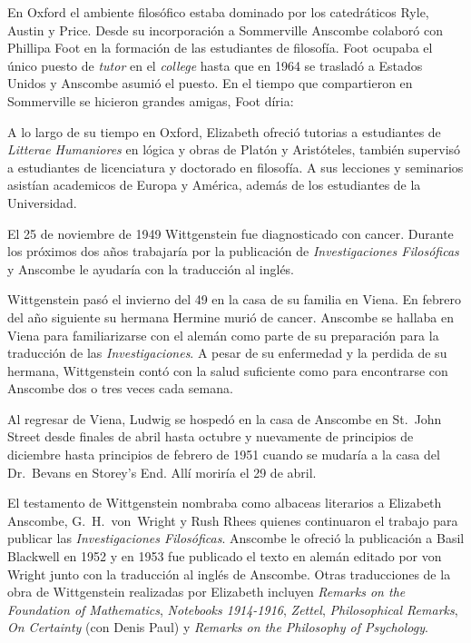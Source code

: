 En Oxford el ambiente filosófico estaba dominado por los catedráticos Ryle, Austin y Price. Desde su incorporación a Sommerville Anscombe colaboró con Phillipa Foot en la formación de las estudiantes de filosofía. Foot ocupaba el único puesto de \emph{tutor} en el \emph{college} hasta que en 1964 se trasladó a Estados Unidos y Anscombe asumió el puesto. En el tiempo que compartieron en Sommerville se hicieron grandes amigas, Foot díria: 

A lo largo de su tiempo en Oxford, Elizabeth ofreció tutorias a estudiantes de \emph{Litterae Humaniores} en lógica y obras de Platón y Aristóteles, también supervisó a estudiantes de licenciatura y doctorado en filosofía. A sus lecciones y seminarios asistían academicos de Europa y América, además de los estudiantes de la Universidad.\autocite[Cf.~][32]{teichman2002fellows}

El 25 de noviembre de 1949 Wittgenstein fue diagnosticado con cancer\autocite[cf.~][loc 11034]{monk}. Durante los próximos dos años trabajaría por la publicación de \emph{Investigaciones Filosóficas} y Anscombe le ayudaría con la traducción al inglés.

Wittgenstein pasó el invierno del 49 en la casa de su familia en Viena. En febrero del año siguiente su hermana Hermine murió de cancer. Anscombe se hallaba en Viena para familiarizarse con el alemán como parte de su preparación para la traducción de las \emph{Investigaciones}. A pesar de su enfermedad y la perdida de su hermana, Wittgenstein contó con la salud suficiente como para encontrarse con Anscombe dos o tres veces cada semana.\autocite[cf.~][loc 11138]{monk}

Al regresar de Viena, Ludwig se hospedó en la casa de Anscombe en St.~John Street desde finales de abril hasta octubre y nuevamente de principios de diciembre hasta principios de febrero de 1951 cuando se mudaría a la casa del Dr.~Bevans en Storey's End.\autocite[cf.~][loc. 11242]{monk} Allí moriría el 29 de abril.

El testamento de Wittgenstein nombraba como albaceas literarios a Elizabeth Anscombe, G.~H.~von~Wright y Rush Rhees quienes continuaron el trabajo para publicar las \emph{Investigaciones Filosóficas}. Anscombe le ofreció la publicación a Basil Blackwell en 1952 y en 1953 fue publicado el texto en alemán editado por von Wright junto con la traducción al inglés de Anscombe. Otras traducciones de la obra de Wittgenstein realizadas por Elizabeth incluyen \emph{Remarks on the Foundation of Mathematics}, \emph{Notebooks 1914-1916}, \emph{Zettel}, \emph{Philosophical Remarks}, \emph{On Certainty} (con Denis Paul) y \emph{Remarks on the Philosophy of Psychology}.\autocite[Cf.~][38]{teichman2002fellows}

